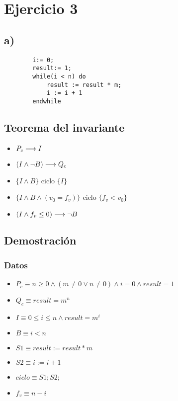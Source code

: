 \documentclass{article}
\begin{document}
\section*{Ejercicio 3}

\subsection*{a)}
\begin{verbatim}
        i:= 0;
        result:= 1;
        while(i < n) do
            result := result * m;
            i := i + 1
        endwhile
\end{verbatim}

\subsection*{Teorema del invariante}
\begin{itemize}
    \item $P_{c} \longrightarrow I$
    \item $(I \wedge \neg B) \longrightarrow Q_{c}$
    \item $\{I \wedge B\}$ ciclo $\{ I \}$
    \item $\{I \wedge B \wedge (v_{0} = f_{v})\}$ ciclo $\{f_{v} < v_{0}\}$
    \item $(I \wedge f_{v} \leq 0) \longrightarrow \neg B$
\end{itemize}

\subsection*{Demostración}
\subsubsection*{Datos}
\begin{itemize}
    \item $P_{c}    \equiv n \geq 0 \wedge (m \neq 0 \vee n \neq 0) \wedge i = 0 \wedge result = 1$
    \item $Q_{c}    \equiv result = m^{n}$
    \item $I        \equiv 0 \leq i \leq n \wedge result = m^{i}$
    \item $B        \equiv i < n$
    \item $S1       \equiv result := result * m$
    \item $S2       \equiv i := i + 1$
    \item $ciclo    \equiv S1;S2;$
    \item $f_{v}    \equiv n-i$
\end{itemize}
\end{document}
